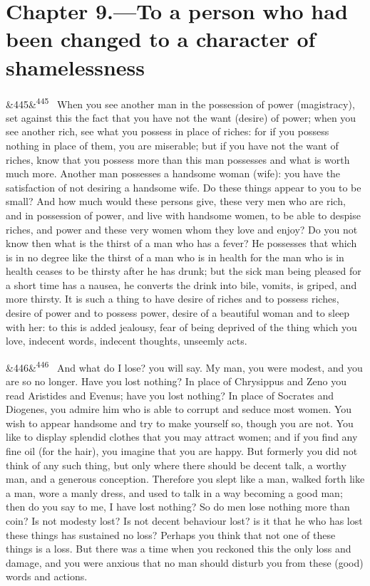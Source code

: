 \documentclass[12pt]{article}
\newcommand{\para}[1][]{\par\noindent\ifx&#1&\else\textsuperscript{\footnotesize #1}~\fi}
\begin{document}
\section*{Chapter 9.---To a person who had been changed to a character of shamelessness}

\para[445] When you see another man in the possession of power (magistracy), set against this the fact that you have not the want (desire) of power; when you see another rich, see what you possess in place of riches: for if you possess nothing in place of them, you are miserable; but if you have not the want of riches, know that you possess more than this man possesses and what is worth much more. Another man possesses a handsome woman (wife): you have the satisfaction of not desiring a handsome wife. Do these things appear to you to be small? And how much would these persons give, these very men who are rich, and in possession of power, and live with handsome women, to be able to despise riches, and power and these very women whom they love and enjoy? Do you not know then what is the thirst of a man who has a fever? He possesses that which is in no degree like the thirst of a man who is in health for the man who is in health ceases to be thirsty after he has drunk; but the sick man being pleased for a short time has a nausea, he converts the drink into bile, vomits, is griped, and more thirsty. It is such a thing to have desire of riches and to possess riches, desire of power and to possess power, desire of a beautiful woman and to sleep with her: to this is added jealousy, fear of being deprived of the thing which you love, indecent words, indecent thoughts, unseemly acts.

\para[446] And what do I lose? you will say. My man, you were modest, and you are so no longer. Have you lost nothing? In place of Chrysippus and Zeno you read Aristides and Evenus; have you lost nothing? In place of Socrates and Diogenes, you admire him who is able to corrupt and seduce most women. You wish to appear handsome and try to make yourself so, though you are not. You like to display splendid clothes that you may attract women; and if you find any fine oil (for the hair), you imagine that you are happy. But formerly you did not think of any such thing, but only where there should be decent talk, a worthy man, and a generous conception. Therefore you slept like a man, walked forth like a man, wore a manly dress, and used to talk in a way becoming a good man; then do you say to me, I have lost nothing? So do men lose nothing more than coin? Is not modesty lost? Is not decent behaviour lost? is it that he who has lost these things has sustained no loss? Perhaps you think that not one of these things is a loss. But there was a time when you reckoned this the only loss and damage, and you were anxious that no man should disturb you from these (good) words and actions.
\end{document}
